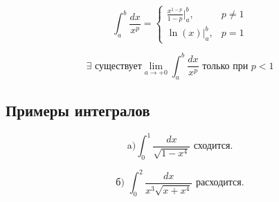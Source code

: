 {\[
\int_{a}^{b} \frac{dx}{x^p} = 
\begin{cases} 
\frac{x^{1-p}}{1-p} \Big|_{a}^{b}, & p \neq 1 \\
\ln(x) \Big|_{a}^{b}, & p = 1
\end{cases}
\]





\[
\exists \text{ существует} \lim_{a \to +0} \int_{a}^{b} \frac{dx}{x^p} \text{ только при } p < 1
\]

\subsection*{Примеры интегралов}


\[
\text{a)} \int_{0}^{1} \frac{dx}{\sqrt{1-x^4}} \text{ сходится.} 
\]

\[
\text{б) }\int_{0}^{2} \frac{dx}{x^3 \sqrt{x + x^4}} \text{ расходится.} 
\]

}